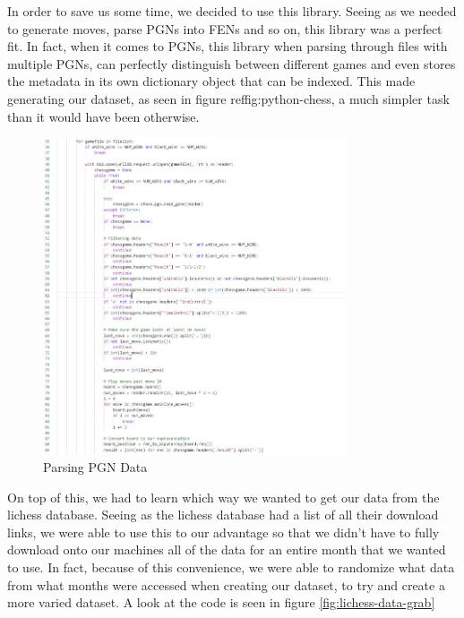 \documentclass[12pt]{article}
\begin{document}
    In order to save us some time, we decided to use this library. Seeing as we needed to generate moves, parse PGNs into FENs and so on, this library was a perfect fit. In fact, when it comes to PGNs, this library when parsing through files with multiple PGNs, can perfectly distinguish between different games and even stores the metadata in its own dictionary object that can be indexed. This made generating our dataset, as seen in figure ref{fig:python-chess}, a much simpler task than it would have been otherwise.

    \begin{singlespace}
        \begin{figure}[ht]
            \centering
            \caption{Parsing PGN Data}
            \label{fig:python-chess}
            \includegraphics[width=0.8\textwidth]{python-chess1.jpg}
        \end{figure}
    \end{singlespace}

    On top of this, we had to learn which way we wanted to get our data from the lichess database. Seeing as the lichess database had a list of all their download links, we were able to use this to our advantage so that we didn't have to fully download onto our machines all of the data for an entire month that we wanted to use. In fact, because of this convenience, we were able to randomize what data from what months were accessed when creating our dataset, to try and create a more varied dataset. A look at the code is seen in figure \ref{fig:lichess-data-grab}
\end{document}

